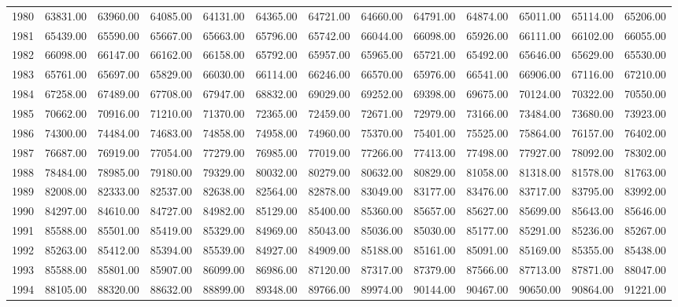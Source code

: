 \begin{longtable}{rrrrrrrrrrrrr}
  1980 & 63831.00 & 63960.00 & 64085.00 & 64131.00 & 64365.00 & 64721.00 & 64660.00 & 64791.00 & 64874.00 & 65011.00 & 65114.00 & 65206.00 \\ 
  1981 & 65439.00 & 65590.00 & 65667.00 & 65663.00 & 65796.00 & 65742.00 & 66044.00 & 66098.00 & 65926.00 & 66111.00 & 66102.00 & 66055.00 \\ 
  1982 & 66098.00 & 66147.00 & 66162.00 & 66158.00 & 65792.00 & 65957.00 & 65965.00 & 65721.00 & 65492.00 & 65646.00 & 65629.00 & 65530.00 \\ 
  1983 & 65761.00 & 65697.00 & 65829.00 & 66030.00 & 66114.00 & 66246.00 & 66570.00 & 65976.00 & 66541.00 & 66906.00 & 67116.00 & 67210.00 \\ 
  1984 & 67258.00 & 67489.00 & 67708.00 & 67947.00 & 68832.00 & 69029.00 & 69252.00 & 69398.00 & 69675.00 & 70124.00 & 70322.00 & 70550.00 \\ 
  1985 & 70662.00 & 70916.00 & 71210.00 & 71370.00 & 72365.00 & 72459.00 & 72671.00 & 72979.00 & 73166.00 & 73484.00 & 73680.00 & 73923.00 \\ 
  1986 & 74300.00 & 74484.00 & 74683.00 & 74858.00 & 74958.00 & 74960.00 & 75370.00 & 75401.00 & 75525.00 & 75864.00 & 76157.00 & 76402.00 \\ 
  1987 & 76687.00 & 76919.00 & 77054.00 & 77279.00 & 76985.00 & 77019.00 & 77266.00 & 77413.00 & 77498.00 & 77927.00 & 78092.00 & 78302.00 \\ 
  1988 & 78484.00 & 78985.00 & 79180.00 & 79329.00 & 80032.00 & 80279.00 & 80632.00 & 80829.00 & 81058.00 & 81318.00 & 81578.00 & 81763.00 \\ 
  1989 & 82008.00 & 82333.00 & 82537.00 & 82638.00 & 82564.00 & 82878.00 & 83049.00 & 83177.00 & 83476.00 & 83717.00 & 83795.00 & 83992.00 \\ 
  1990 & 84297.00 & 84610.00 & 84727.00 & 84982.00 & 85129.00 & 85400.00 & 85360.00 & 85657.00 & 85627.00 & 85699.00 & 85643.00 & 85646.00 \\ 
  1991 & 85588.00 & 85501.00 & 85419.00 & 85329.00 & 84969.00 & 85043.00 & 85036.00 & 85030.00 & 85177.00 & 85291.00 & 85236.00 & 85267.00 \\ 
  1992 & 85263.00 & 85412.00 & 85394.00 & 85539.00 & 84927.00 & 84909.00 & 85188.00 & 85161.00 & 85091.00 & 85169.00 & 85355.00 & 85438.00 \\ 
  1993 & 85588.00 & 85801.00 & 85907.00 & 86099.00 & 86986.00 & 87120.00 & 87317.00 & 87379.00 & 87566.00 & 87713.00 & 87871.00 & 88047.00 \\ 
  1994 & 88105.00 & 88320.00 & 88632.00 & 88899.00 & 89348.00 & 89766.00 & 89974.00 & 90144.00 & 90467.00 & 90650.00 & 90864.00 & 91221.00 \\ 

\end{longtable}
